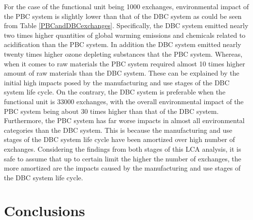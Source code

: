 \documentclass[3p,times,procedia]{elsarticle}
\begin{document}
For the case of the functional unit being 1000 exchanges, environmental impact of the PBC system is slightly lower than that of the DBC system as could be seen from Table \ref{PBCandDBCexchanges}. Specifically, the DBC system emitted nearly two times higher quantities of global warming emissions and chemicals  related to acidification than the PBC system. In addition the DBC system emitted nearly twenty times higher ozone depleting substances that the PBC system. Whereas, when it comes to raw materials the PBC system required almost 10 times higher amount of raw materials than the DBC system. These can be explained by the initial high impacts posed by the manufacturing and use stages of the DBC system life cycle. On the contrary, the DBC system is preferable when the functional unit is 33000 exchanges, with the overall environmental impact of the PBC system being about 30 times higher than that of the DBC system. Furthermore, the PBC system has far worse impacts in almost all environmental categories than the DBC system. This is because the manufacturing and use stages of the DBC system life cycle have been amortized over high number of exchanges. Considering the findings from both stages of this LCA analysis, it is safe to assume that up to certain limit the higher the number of exchanges, the more amortized are the impacts caused by the manufacturing and use stages of the DBC system life cycle.

\section{Conclusions}
\end{document}
